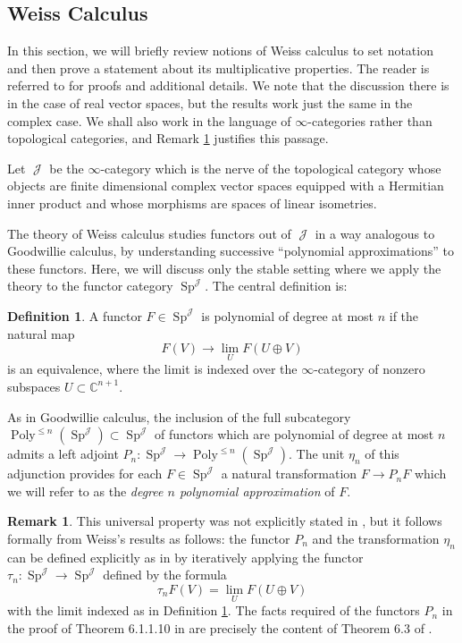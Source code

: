 \documentclass[reqno, oneside]{amsart}
\theoremstyle{definition}
\newtheorem{dfn}[nul]{Definition}
\newtheorem{rmk}[nul]{Remark}
\theoremstyle{plain}
\DeclareMathOperator{\Poly}{\text{Poly}}
\DeclareMathOperator{\Sp}{\text{Sp}}
\DeclareMathOperator{\J}{\mathcal{J}}
\begin{document}
\subsection{Weiss Calculus}
In this section, we will briefly review notions of Weiss calculus to set notation and then prove a statement about its multiplicative properties.  The reader is referred to \cite{Weiss} for proofs and additional details.  We note that the discussion there is in the case of real vector spaces, but the results work just the same in the complex case.  We shall also work in the language of $\infty$-categories rather than topological categories, and Remark \ref{rmk:infinityweiss} justifies this passage.  

Let $\J$ be the $\infty$-category which is the nerve of the topological category whose objects are finite dimensional complex vector spaces equipped with a Hermitian inner product and whose morphisms are spaces of linear isometries.  

The theory of Weiss calculus studies functors out of $\J$ in a way analogous to Goodwillie calculus, by understanding successive ``polynomial approximations'' to these functors.  Here, we will discuss only the stable setting where we apply the theory to the functor category $\Sp^{\J}$. The central definition is:

\begin{dfn}\label{dfn:polyfun}
A functor $F\in \Sp^{\J}$ is polynomial of degree at most $n$ if the natural map $$F(V) \to \lim_U F(U\oplus V)$$ is an equivalence, where the limit is indexed over the $\infty$-category of nonzero subspaces $U\subset \mathbb{C}^{n+1}.$
\end{dfn}

As in Goodwillie calculus, the inclusion of the full subcategory $\Poly^{\leq n}(\Sp^{\J}) \subset \Sp^{\J}$ of functors which are polynomial of degree at most $n$ admits a left adjoint $P_n: \Sp^{\J} \to \Poly^{\leq n}(\Sp^{\J}).$  The unit $\eta_n$ of this adjunction provides for each $F\in \Sp^{\J}$ a natural transformation $F \to P_nF$ which we will refer to as the \emph{degree $n$ polynomial approximation} of $F$. 

\begin{rmk}\label{rmk:infinityweiss}
This universal property was not explicitly stated in \cite{Weiss}, but it follows formally from Weiss's results as follows: the functor $P_n$ and the transformation $\eta_n$ can be defined explicitly as in \cite{Weiss} by iteratively applying the functor $\tau_n: \Sp^{\J} \to \Sp^{\J}$ defined by the formula $$\tau_n F(V) = \lim_U F(U\oplus V)$$ with the limit indexed as in Definition \ref{dfn:polyfun}.   The facts required of the functors $P_n$ in the proof of Theorem 6.1.1.10 in \cite{HA} are precisely the content of Theorem 6.3 of \cite{Weiss}.  
\end{rmk}
\end{document}
